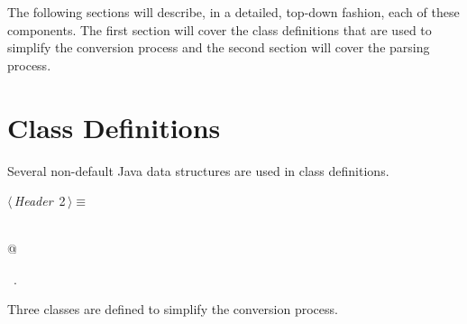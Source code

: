 \documentclass[a4paper]{report}
\begin{document}
The following sections will describe, in a detailed, top-down fashion, each of these components. The first section will cover the class definitions that are used to simplify the conversion process and the second section will cover the parsing process.

\section{Class Definitions}

Several non-default Java data structures are used in class definitions.
\begin{flushleft} \small
\begin{minipage}{\linewidth}\label{scrap2}\raggedright\small
{} $\langle\,${\itshape Header}\nobreak\ {\footnotesize {2}}$\,\rangle\equiv$
\vspace{-1ex}
\begin{list}{}{} \item
\mbox{}\verb@@\\
\mbox{}@\\
\mbox{}\verb@@{\NWsep}
\end{list}
\vspace{-1.5ex}
\footnotesize
\begin{list}{}{\setlength{\itemsep}{-\parsep}\setlength{\itemindent}{-\leftmargin}}
\item \NWtxtMacroRefIn\ .

\item{}
\end{list}
\end{minipage}\vspace{4ex}
\end{flushleft}
Three classes are defined to simplify the conversion process.
\end{document}
